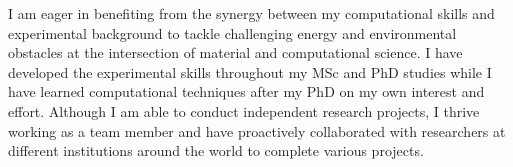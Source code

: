 

\begin{cvparagraph}

I am eager in benefiting from the synergy between my computational skills and experimental background to tackle challenging energy and environmental obstacles at the intersection of material and computational science. I have developed the experimental skills throughout my MSc and PhD studies while I have learned computational techniques after my PhD on my own interest and effort. Although I am able to conduct independent research projects, I thrive working as a team member and have proactively collaborated with researchers at different institutions around the world to complete various projects. 
\end{cvparagraph}
